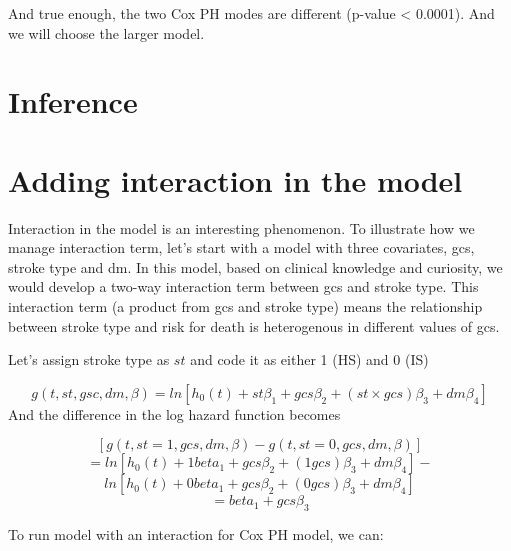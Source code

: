 \documentclass[
  10pt,
]{krantz}
\begin{document}
And true enough, the two Cox PH modes are different (p-value \textless{} 0.0001). And we will choose the larger model.

\hypertarget{inference}{%
\section{Inference}\label{inference}}

\hypertarget{adding-interaction-in-the-model}{%
\section{\texorpdfstring{Adding interaction in the model}{Adding interaction in the model}}\label{adding-interaction-in-the-model}}

Interaction in the model is an interesting phenomenon. To illustrate how we manage interaction term, let's start with a model with three covariates, gcs, stroke type and dm. In this model, based on clinical knowledge and curiosity, we would develop a two-way interaction term between gcs and stroke type. This interaction term (a product from gcs and stroke type) means the relationship between stroke type and risk for death is heterogenous in different values of gcs.

Let's assign stroke type as \(st\) and code it as either 1 (HS) and 0 (IS)

\[g(t,st,gsc,dm,\beta) = ln[h_0(t) + st\beta_1 + gcs\beta_2 + (st \times gcs)\beta_3 + dm\beta_4]\]
And the difference in the log hazard function becomes

\[[g(t,st = 1,gcs, dm,\beta) - g(t,st = 0,gcs, dm,\beta)]\]
\[= ln[h_0(t) + 1beta_1 + gcs\beta_2 + (1gcs)\beta_3 + dm\beta_4] -\]
\[ln[h_0(t) + 0beta_1 + gcs\beta_2 + (0gcs)\beta_3 + dm\beta_4]\]
\[=beta_1 + gcs\beta_3\]

To run model with an interaction for Cox PH model, we can:
\end{document}
